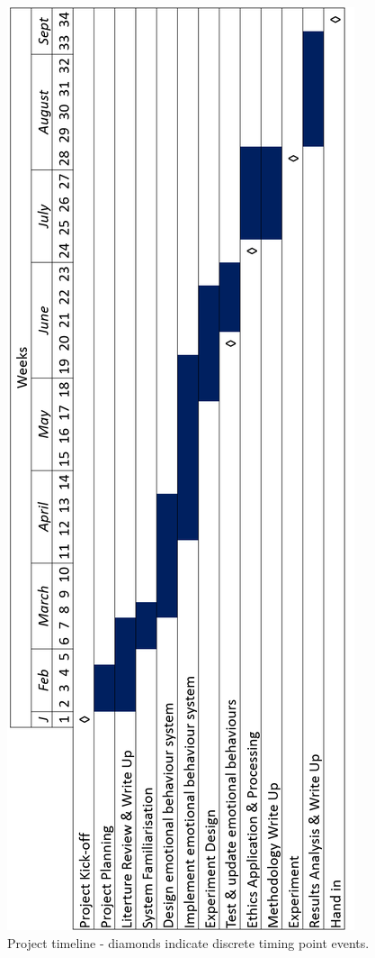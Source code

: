 \documentclass[11pt]{article}
\begin{document}
\begin{figure}
\centering
\includegraphics[height=0.9\textheight,]{ProjectTimeline2.png}
\caption{Project timeline - diamonds indicate discrete timing point events.}
\label{fig:ProjectTimeline}
\end{figure}



\end{document}
